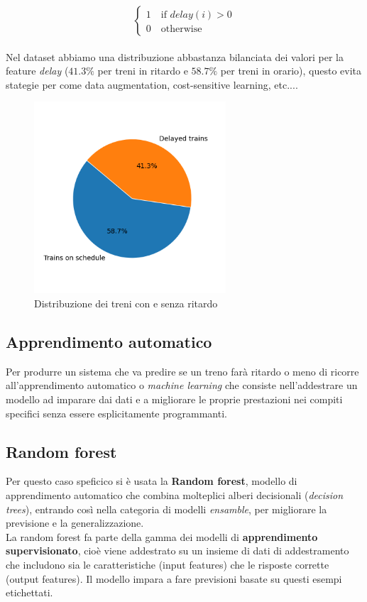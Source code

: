 \documentclass[italian,12pt,a4paper]{article}
\begin{document}
			\begin{equation*}
				\begin{cases}
					1 \quad \text{if } delay(i) > 0  \\
					0 \quad \text{otherwise}
				\end{cases}
			\end{equation*}
			\linebreak
			\\
			Nel dataset abbiamo una distribuzione abbastanza bilanciata dei valori per la feature \textit{delay} ($41.3\%$ per treni in ritardo e $58.7\%$ per treni in orario), questo evita stategie per come data augmentation, cost-sensitive learning, etc....
			
			\begin{figure}[!h]
				\centering
				\includegraphics[width=270px]{img/delay_graph}
				\caption{Distribuzione dei treni con e senza ritardo}
			\end{figure}
			
	\subsection{Apprendimento automatico}
	Per produrre un sistema che va predire se un treno farà ritardo o meno di ricorre all'apprendimento automatico o \textit{machine learning} che consiste nell'addestrare un modello ad imparare dai dati e a migliorare le proprie prestazioni nei compiti specifici senza essere esplicitamente programmanti.
	
	\subsection{Random forest}
	Per questo caso speficico si è usata la \textbf{Random forest}, modello di apprendimento automatico che combina molteplici alberi decisionali (\textit{decision trees}), entrando così nella categoria di modelli \textit{ensamble}, per migliorare la previsione e la generalizzazione.\\
	La random forest fa parte della gamma dei modelli di \textbf{apprendimento supervisionato}, cioè viene addestrato su un insieme di dati di addestramento che includono sia le caratteristiche (input features) che le risposte corrette (output features). 
	Il modello impara a fare previsioni basate su questi esempi etichettati.
		
\end{document}
